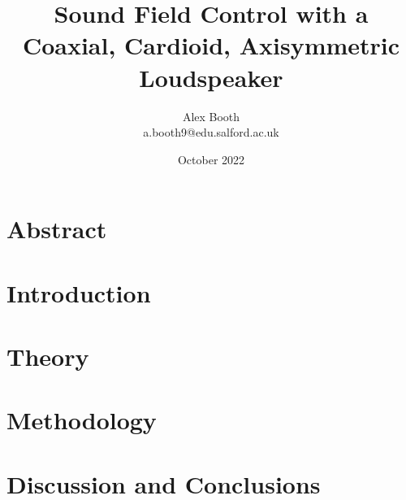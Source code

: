 \documentclass{article}
\title{Sound Field Control with a Coaxial, Cardioid, Axisymmetric Loudspeaker}
\author{Alex Booth\\ a.booth9@edu.salford.ac.uk}
\date{October 2022}
\begin{document}
\maketitle
\section*{Abstract}
    \textit{}
\tableofcontents
\newpage

\section{Introduction}
    

\section{Theory}


\section{Methodology}

\section{Discussion and Conclusions}
\end{document}
